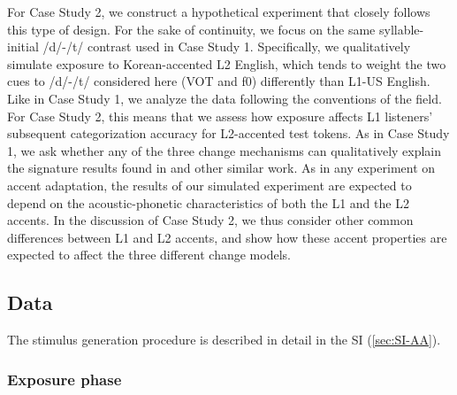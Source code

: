 \documentclass[
  11pt,
  man,floatsintext]{apa6}
\begin{document}
For Case Study 2, we construct a hypothetical experiment that closely follows this type of design. For the sake of continuity, we focus on the same syllable-initial /d/-/t/ contrast used in Case Study 1. Specifically, we qualitatively simulate exposure to Korean-accented L2 English, which tends to weight the two cues to /d/-/t/ considered here (VOT and f0) differently than L1-US English. Like in Case Study 1, we analyze the data following the conventions of the field. For Case Study 2, this means that we assess how exposure affects L1 listeners' subsequent categorization accuracy for L2-accented test tokens. As in Case Study 1, we ask whether any of the three change mechanisms can qualitatively explain the signature results found in \textcite{xie2016jep} and other similar work. As in any experiment on accent adaptation, the results of our simulated experiment are expected to depend on the acoustic-phonetic characteristics of both the L1 and the L2 accents. In the discussion of Case Study 2, we thus consider other common differences between L1 and L2 accents, and show how these accent properties are expected to affect the three different change models.

\subsection{Data}\label{data-1}

The stimulus generation procedure is described in detail in the SI (\ref{sec:SI-AA}).

\subsubsection{Exposure phase}\label{exposure-phase-1}
\end{document}
